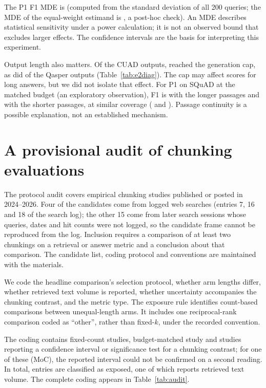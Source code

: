 \documentclass[11pt]{article}
\DeclareRobustCommand{\artifactref}[1]{}
\DeclareRobustCommand{\artifactref}[1]{ (\path{#1})}
\begin{document}
The P1 F1 MDE is \EtwoPoneFoneMde{} (computed from the standard deviation of all 200 queries; the MDE of the equal-weight estimand is \EtwoPoneFoneMdeStrat{}, a post-hoc check). An MDE describes statistical sensitivity under a power calculation; it is not an observed bound that excludes larger effects. The confidence intervals are the basis for interpreting this experiment.

Output length also matters. Of the \EtwoJobsCuad{} CUAD outputs, \EtwoTruncCuad{} reached the generation cap, as did \EtwoTruncQasper{} of the \EtwoJobsQasper{} Qasper outputs (Table~\ref{tab:e2diag}). The cap may affect scores for long answers, but we did not isolate that effect. For P1 on SQuAD at the matched budget (an exploratory observation), F1 is \EtwoSquadFiveTwelveBudgetFone{} with the longer passages and \EtwoSquadOneTwoEightBudgetFone{} with the shorter passages, at similar coverage (\EtwoSquadFiveTwelveBudgetCov{} and \EtwoSquadOneTwoEightBudgetCov{}). Passage continuity is a possible explanation, not an established mechanism.

\section{A provisional audit of chunking evaluations}\label{sec:audit}
The protocol audit covers \AuditN{} empirical chunking studies published or posted in 2024--2026. Four of the candidates come from logged web searches (entries 7, 16 and 18 of the search log); the other 15 come from later search sessions whose queries, dates and hit counts were not logged, so the candidate frame cannot be reproduced from the log. Inclusion requires a comparison of at least two chunkings on a retrieval or answer metric and a conclusion about that comparison. The candidate list, coding protocol and conventions are maintained with the materials\artifactref{literature/protocol_audit/}.

We code the headline comparison's selection protocol, whether arm lengths differ, whether retrieved text volume is reported, whether uncertainty accompanies the chunking contrast, and the metric type. The exposure rule identifies count-based comparisons between unequal-length arms. It includes one reciprocal-rank comparison coded as ``other'', rather than fixed-$k$, under the recorded convention.

The coding contains \AuditFixedK{} fixed-count studies, \AuditBudget{} budget-matched study and \AuditUncertainty{} studies reporting a confidence interval or significance test for a chunking contrast; for one of these (MoC), the reported interval could not be confirmed on a second reading. In total, \AuditExposed{} entries are classified as exposed, one of which reports retrieved text volume. The complete coding appears in Table~\ref{tab:audit}.
\end{document}
